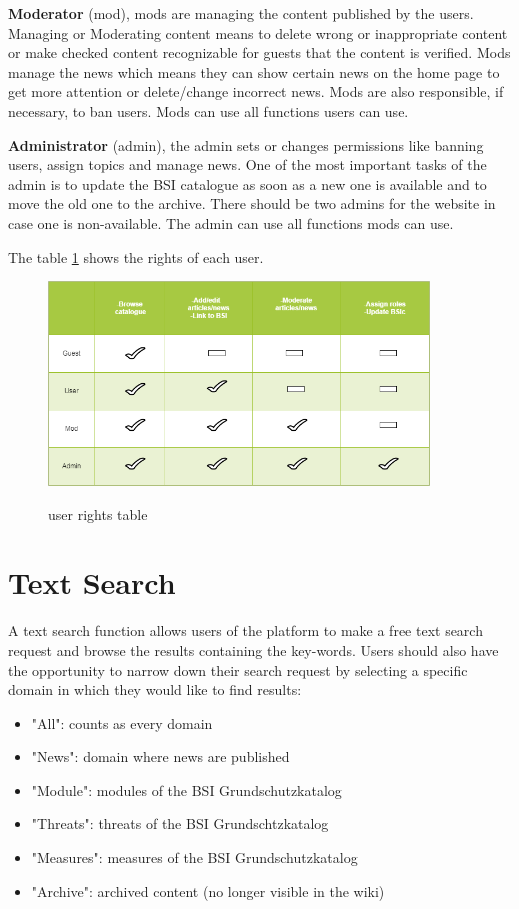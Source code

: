 \textbf{Moderator} (mod), mods are managing the content published by the users.
Managing or Moderating content means to delete wrong or inappropriate content or make checked content recognizable for guests that the content is verified.  
Mods manage the news which means they can show certain news on the home page to get more attention or delete/change incorrect news. 
Mods are also responsible, if necessary, to ban users. 
Mods can use all functions users can use.
\bigskip

\textbf{Administrator} (admin), the admin sets or changes permissions like banning users, assign topics and manage news.
One of the most important tasks of the admin is to update the BSI catalogue as soon as a new one is available and to move the old one to the archive.  There should be two admins for the website in case one is non-available.
The admin can use all functions mods can use. 
\bigskip

The table \ref{fig:usertypes} shows the rights of each user.

\begin{figure}[h]
    \centering
    \includegraphics[width=0.9\textwidth]{Pictures/user_types}
    \label{fig:usertypes}
    \caption{user rights table}
\end{figure}

\section{Text Search}
\label{search_function}
A text search function allows users of the platform to make a free text search request and browse the results containing the key-words. 
Users should also have the opportunity to narrow down their search request by selecting a specific domain in which they would like to find results:
\begin{itemize}
\item "All": counts as every domain
\item "News": domain where news are published
\item "Module": modules of the BSI Grundschutzkatalog
\item "Threats": threats of the BSI Grundschtzkatalog
\item "Measures": measures of the BSI Grundschutzkatalog
\item "Archive": archived content (no longer visible in the wiki)
\end{itemize}
 
